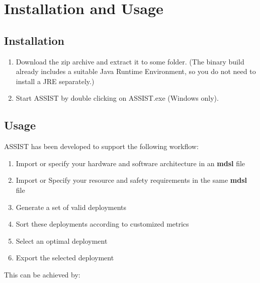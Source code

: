 
\chapter{Installation and Usage}
\label{cha:installation-and-usage}

\section{Installation}

\begin{enumerate}
\item Download the zip archive and extract it to some folder. 
      (The binary build already includes a suitable Java Runtime Environment, so you do not need to install a JRE separately.)
    \item Start ASSIST by double clicking on ASSIST.exe (Windows only).
\end{enumerate}

\section{Usage}

ASSIST has been developed to support the following workflow:

\begin{enumerate}
\item Import or specify your hardware and software architecture in an \textbf{mdsl} file
\item Import or Specify your resource and safety requirements in the same \textbf{mdsl} file
\item Generate a set of valid deployments 
\item Sort these deployments according to customized metrics
\item Select an optimal deployment 
\item Export the selected deployment
\end{enumerate}

This can be achieved by:

